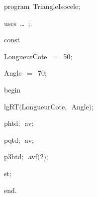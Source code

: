 
{
\parindent {}
\medskip

\carrenoir
\vspace{\neglskip}\mbox{\blc  \idt  \mcl program\idt \ TriangleIsocele$;$
}\par 
\vspace{\neglskip}\mbox{\blc \blk\idt \mcl uses\idt \ \ldots\ $;$
}\par 
\pagebreak[3] 
\vspace{\neglskip}\mbox{\blc  \blk\idt  \mcl const\idt }\par 
\vspace{\neglskip}\mbox{\blc  \blk\blk\idt  LongueurCote\ $=$\ 50$;$}\par 
\vspace{\neglskip}\mbox{\blc  \blk\blk\idt  Angle\ $=$\ 70$;$}\par 
\vspace{\neglskip}\mbox{\blc  \idt  \mcl begin\idt }\par 
\vspace{\neglskip}\mbox{\blc  \blk\idt  lgRT$($LongueurCote$,$\ Angle$)$$;$\ }\par 
\vspace{\neglskip}\mbox{\blc  \blk\idt  phtd$;$\ av$;$}\par 
\vspace{\neglskip}\mbox{\blc  \blk\idt  pqtd$;$\ av$;$}\par 
\vspace{\neglskip}\mbox{\blc  \blk\idt  p3htd$;$\ avf$($2$)$$;$}\par 
\vspace{\neglskip}\mbox{\blc  \blk\idt  st$;$\ }\par 
\vspace{\neglskip}\mbox{\blc  \idt  \mcl end\idt $.$}\par 

\medskip }

